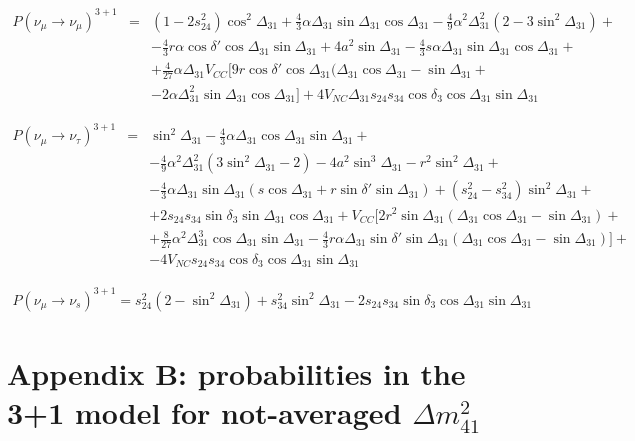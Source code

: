 \documentclass[12pt]{article}
\begin{document}
\begin{eqnarray}
 \nonumber P(\nu_\mu\to\nu_\mu)^{3+1}&=&(1-2s_{24}^2)\cos^2\Delta_{31}+\frac{4}{3} \alpha \Delta_{31}\sin\Delta_{31}\cos\Delta_{31}-\frac{4}{9}\alpha^2\Delta_{31}^2(2-3\sin^2\Delta_{31})+\\
\nonumber & &-\frac{4}{3}r\alpha \cos\delta'\cos\Delta_{31}\sin\Delta_{31}+4a^2\sin\Delta_{31}-\frac{4}{3}s\alpha\Delta_{31}\sin\Delta_{31}\cos\Delta_{31}+ \\
\nonumber & &+\frac{4}{27}\alpha\Delta_{31}V_{CC}[9r \cos\delta'\cos\Delta_{31}(\Delta_{31}\cos\Delta_{31}-\sin\Delta_{31}+\\
 & &-2\alpha\Delta_{31}^2\sin\Delta_{31}\cos\Delta_{31}] +4V_{NC}\Delta_{31}s_{24}s_{34}\cos\delta_3\cos\Delta_{31}\sin\Delta_{31}
\end{eqnarray}

\begin{eqnarray}
 \nonumber P(\nu_\mu\to\nu_\tau)^{3+1}&=& \sin^2\Delta_{31}-\frac{4}{3}\alpha\Delta_{31}\cos\Delta_{31}\sin\Delta_{31}+ \\
 \nonumber & & -\frac{4}{9}\alpha^2\Delta_{31}^2(3\sin^2\Delta_{31}-2)-4a^2\sin^3\Delta_{31}-r^2\sin^2\Delta_{31}+\\
 \nonumber& &-\frac{4}{3}\alpha \Delta_{31}\sin\Delta_{31}(s\cos\Delta_{31}+r\sin\delta'\sin\Delta_{31})+(s_{24}^2-s_{34}^2)\sin^2\Delta_{31}+ \\
 \nonumber & & +2s_{24}s_{34}\sin\delta_3\sin\Delta_{31}\cos\Delta_{31} +V_{CC}\bigg[2r^2\sin\Delta_{31}(\Delta_{31}\cos\Delta_{31}-\sin\Delta_{31})+\\
 \nonumber & & +\frac{8}{27}\alpha^2\Delta_{31}^3\cos\Delta_{31}\sin\Delta_{31}-\frac{4}{3}r\alpha\Delta_{31}\sin\delta'\sin\Delta_{31}(\Delta_{31}\cos\Delta_{31}-\sin\Delta_{31})\bigg]+\\
  & & -4V_{NC}s_{24}s_{34}\cos\delta_3\cos\Delta_{31}\sin\Delta_{31}
\end{eqnarray}

\begin{eqnarray}
 P(\nu_\mu\to\nu_s)^{3+1}=s_{24}^2(2-\sin^2\Delta_{31})+s_{34}^2\sin^2\Delta_{31}-2s_{24}s_{34}\sin\delta_3\cos\Delta_{31}\sin\Delta_{31}
\end{eqnarray}



\section*{Appendix B: probabilities in the 3+1 model for not-averaged $\Delta m_{41}^2$}
\end{document}
